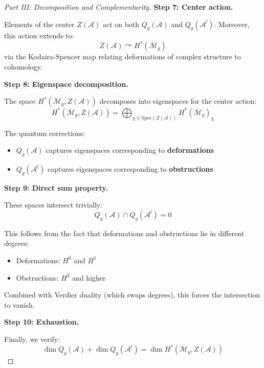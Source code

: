 \begin{proof}[Part III: Decomposition and Complementarity]

\textbf{Step 7: Center action.}

Elements of the center $Z(\mathcal{A})$ act on both $Q_g(\mathcal{A})$ and $Q_g(\mathcal{A}^!)$. Moreover, this action extends to:
\begin{equation}
Z(\mathcal{A}) \curvearrowright H^*(\overline{\mathcal{M}}_g)
\end{equation}
via the Kodaira-Spencer map relating deformations of complex structure to cohomology.

\textbf{Step 8: Eigenspace decomposition.}

The space $H^*(\overline{\mathcal{M}}_g, Z(\mathcal{A}))$ decomposes into eigenspaces for the center action:
\begin{equation}
H^*(\overline{\mathcal{M}}_g, Z(\mathcal{A})) = \bigoplus_{\chi \in \text{Spec}(Z(\mathcal{A}))} H^*(\overline{\mathcal{M}}_g)_\chi
\end{equation}

The quantum corrections:
\begin{itemize}
\item $Q_g(\mathcal{A})$ captures eigenspaces corresponding to \textbf{deformations}
\item $Q_g(\mathcal{A}^!)$ captures eigenspaces corresponding to \textbf{obstructions}
\end{itemize}

\textbf{Step 9: Direct sum property.}

These spaces intersect trivially:
\begin{equation}
Q_g(\mathcal{A}) \cap Q_g(\mathcal{A}^!) = 0
\end{equation}

This follows from the fact that deformations and obstructions lie in different degrees:
\begin{itemize}
\item Deformations: $H^0$ and $H^1$
\item Obstructions: $H^2$ and higher
\end{itemize}

Combined with Verdier duality (which swaps degrees), this forces the intersection to vanish.

\textbf{Step 10: Exhaustion.}

Finally, we verify:
\begin{equation}
\dim Q_g(\mathcal{A}) + \dim Q_g(\mathcal{A}^!) = \dim H^*(\overline{\mathcal{M}}_g, Z(\mathcal{A}))
\end{equation}


\end{proof}
